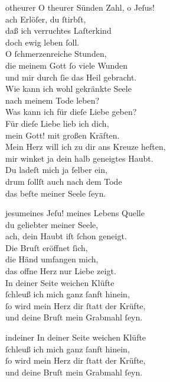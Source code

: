 \documentclass[shorttitlesize=55,tocstyle=ref-genre]{ees}
\begin{document}
{\begin{movement}{otheurer}
  O theurer Sünden Zahl, o Jeſus!\\
  ach Erlöſer, du ſtirbſt,\\
  daß ich verruchtes Laſterkind\\
  doch ewig leben ſoll.\\
  O ſchmerzenreiche Stunden,\\
  die meinem Gott ſo viele Wunden\\
  und mir durch ſie das Heil gebracht.\\
  Wie kann ich wohl gekränkte Seele\\
  nach meinem Tode leben?\\
  Was kann ich für dieſe Liebe geben?\\
  Für dieſe Liebe lieb ich dich,\\
  mein Gott! mit großen Kräften.\\
  Mein Herz will ich zu dir ans Kreuze heften,\\
  mir winket ja dein halb geneigtes Haubt.\\
  Du ladeſt mich ja ſelber ein,\\
  drum ſollſt auch nach dem Tode\\
  das beſte meiner Seele ſeyn.
\end{movement}

\begin{movement}{jesumeines}
  Jeſu! meines Lebens Quelle\\
  du geliebter meiner Seele,\\
  ach, dein Haubt iſt ſchon geneigt.\\
  Die Bruſt eröffnet ſich,\\
  die Händ umfangen mich,\\
  das offne Herz nur Liebe zeigt.\\
  In deiner Seite weichen Klüfte\\
  ſchleuß ich mich ganz ſanft hinein,\\
  ſo wird mein Herz dir ſtatt der Krüfte,\\
  und deine Bruſt mein Grabmahl ſeyn.
\end{movement}

\begin{movement}{indeiner}
  \voice[Chor]
  In deiner Seite weichen Klüfte\\
  ſchleuß ich mich ganz ſanft hinein,\\
  ſo wird mein Herz dir ſtatt der Krüfte,\\
  und deine Bruſt mein Grabmahl ſeyn.
\end{movement}
}

\eesScore
\end{document}
